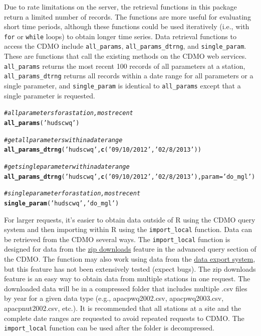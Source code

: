 \documentclass[10pt,letterpaper]{article}\usepackage[]{graphicx}\usepackage[]{color}
\makeatletter
\newcommand{\hlstr}[1]{\textcolor[rgb]{0.192,0.494,0.8}{#1}}%
\newcommand{\hlcom}[1]{\textcolor[rgb]{0.678,0.584,0.686}{\textit{#1}}}%
\newcommand{\hlstd}[1]{\textcolor[rgb]{0.345,0.345,0.345}{#1}}%
\newcommand{\hlkwc}[1]{\textcolor[rgb]{0.333,0.667,0.333}{#1}}%
\newcommand{\hlkwd}[1]{\textcolor[rgb]{0.737,0.353,0.396}{\textbf{#1}}}%
\newenvironment{kframe}{%
 \def\at@end@of@kframe{}%
 \ifinner\ifhmode%
  \def\at@end@of@kframe{\end{minipage}}%
  \begin{minipage}{\columnwidth}%
 \fi\fi%
 \def\FrameCommand##1{\hskip\@totalleftmargin \hskip-\fboxsep
 \colorbox{shadecolor}{##1}\hskip-\fboxsep
     \hskip-\linewidth \hskip-\@totalleftmargin \hskip\columnwidth}%
 \MakeFramed {\advance\hsize-\width
   \@totalleftmargin\z@ \linewidth\hsize
   \@setminipage}}%
 {\par\unskip\endMakeFramed%
 \at@end@of@kframe}
\newenvironment{knitrout}{}{} %
\makeatother
\begin{document}
Due to rate limitations on the server, the retrieval functions in this package return a limited number of records.  The functions are more useful for evaluating short time periods, although these functions could be used iteratively (i.e., with \texttt{for} or \texttt{while} loops) to obtain longer time series.  Data retrieval functions to access the \ac{CDMO} include \texttt{all\_params}, \texttt{all\_params\_dtrng}, and \texttt{single\_param}.  These are functions that call the existing methods on the CDMO web services.  \texttt{all\_params} returns the most recent 100 records of all parameters at a station, \texttt{all\_params\_dtrng} returns all records within a date range for all parameters or a single parameter, and \texttt{single\_param} is identical to \texttt{all\_params} except that a single parameter is requested.    

\begin{knitrout}
\color{fgcolor}\begin{kframe}
\begin{alltt}
\hlcom{# all parameters for a station, most recent}
\hlkwd{all_params}\hlstd{(}\hlstr{'hudscwq'}\hlstd{)}

\hlcom{# get all parameters within a date range}
\hlkwd{all_params_dtrng}\hlstd{(}\hlstr{'hudscwq'}\hlstd{,} \hlkwd{c}\hlstd{(}\hlstr{'09/10/2012'}\hlstd{,} \hlstr{'02/8/2013'}\hlstd{))}

\hlcom{# get single parameter within a date range}
\hlkwd{all_params_dtrng}\hlstd{(}\hlstr{'hudscwq'}\hlstd{,} \hlkwd{c}\hlstd{(}\hlstr{'09/10/2012'}\hlstd{,} \hlstr{'02/8/2013'}\hlstd{),} \hlkwc{param} \hlstd{=} \hlstr{'do_mgl'}\hlstd{)}

\hlcom{# single parameter for a station, most recent}
\hlkwd{single_param}\hlstd{(}\hlstr{'hudscwq'}\hlstd{,} \hlstr{'do_mgl'}\hlstd{)}
\end{alltt}
\end{kframe}
\end{knitrout}

For larger requests, it's easier to obtain data outside of R using the \ac{CDMO} query system and then importing within R using the \texttt{import\_local} function.  Data can be retrieved from the \ac{CDMO} several ways.  The \texttt{import\_local} function is designed for data from the \href{http://cdmo.baruch.sc.edu/aqs/zips.cfm}{zip downloads} feature in the advanced query section of the \ac{CDMO}. The function may also work using data from the \href{http://cdmo.baruch.sc.edu/get/export.cfm}{data export system}, but this feature has not been extensively tested (expect bugs).  The zip downloads feature is an easy way to obtain data from multiple stations in one request.  The downloaded data will be in a compressed folder that includes multiple .csv files by year for a given data type (e.g., apacpwq2002.csv, apacpwq2003.csv, apacpnut2002.csv, etc.).  It is recommended that all stations at a site and the complete date ranges are requested to avoid repeated requests to \ac{CDMO}.  The \texttt{import\_local} function can be used after the folder is decompressed.
\end{document}
